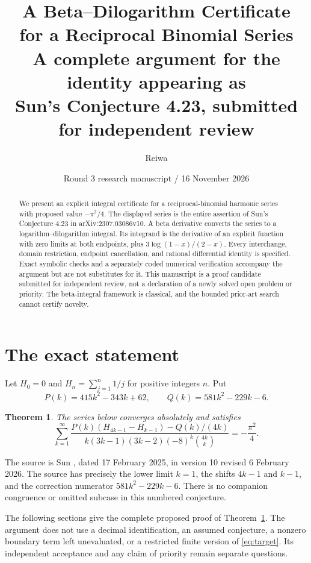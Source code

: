 \documentclass[11pt,a4paper]{article}
\title{A Beta--Dilogarithm Certificate\\for a Reciprocal Binomial Series\\[5pt]\large A complete argument for the identity appearing as\\Sun's Conjecture 4.23, submitted for independent review}
\author{Reiwa}
\date{Round 3 research manuscript / 16 November 2026}
\newtheorem{theorem}{Theorem}[section]
\numberwithin{equation}{section}
\begin{document}
\maketitle
\begin{abstract}
We present an explicit integral certificate for a reciprocal-binomial harmonic series with proposed value $-\pi^2/4$. The displayed series is the entire assertion of Sun's Conjecture 4.23 in arXiv:2307.03086v10. A beta derivative converts the series to a logarithm--dilogarithm integral. Its integrand is the derivative of an explicit function with zero limits at both endpoints, plus $3\log(1-x)/(2-x)$. Every interchange, domain restriction, endpoint cancellation, and rational differential identity is specified. Exact symbolic checks and a separately coded numerical verification accompany the argument but are not substitutes for it. This manuscript is a proof candidate submitted for independent review, not a declaration of a newly solved open problem or priority. The beta-integral framework is classical, and the bounded prior-art search cannot certify novelty.
\end{abstract}

\section{The exact statement}
Let $H_0=0$ and $H_n=\sum_{j=1}^n1/j$ for positive integers $n$. Put
\[
 P(k)=415k^2-343k+62,\qquad Q(k)=581k^2-229k-6.
\]
\begin{theorem}\label{thm:main}
The series below converges absolutely and satisfies
\begin{equation}\label{eq:target}
 \sum_{k=1}^{\infty}
 \frac{P(k)(H_{4k-1}-H_{k-1})-Q(k)/(4k)}
 {k(3k-1)(3k-2)(-8)^k\binom{4k}{k}}
 =-\frac{\pi^2}{4}.
\end{equation}
\end{theorem}
The source is Sun \cite[p.~20, Conjecture 4.23, equation (4.25)]{Sun}, dated 17 February 2025, in version 10 revised 6 February 2026. The source has precisely the lower limit $k=1$, the shifts $4k-1$ and $k-1$, and the correction numerator $581k^2-229k-6$. There is no companion congruence or omitted subcase in this numbered conjecture.

The following sections give the complete proposed proof of Theorem~\ref{thm:main}. The argument does not use a decimal identification, an assumed conjecture, a nonzero boundary term left unevaluated, or a restricted finite version of \eqref{eq:target}. Its independent acceptance and any claim of priority remain separate questions.
\end{document}
